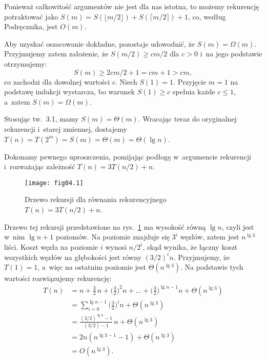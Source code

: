 Ponieważ całkowitość argumentów nie jest dla nas istotna, to możemy rekurencję potraktować jako $S(m)=S(\lfloor m/2\rfloor)+S(\lceil m/2\rceil)+1$, co, według Podręcznika, jest $O(m)$.

Aby uzyskać oszacowanie dokładne, pozostaje udowodnić, że $S(m)=\Omega(m)$. Przyjmujemy zatem założenie, że $S(m/2)\ge cm/2$ dla $c>0$ i~na jego podstawie otrzymujemy:
\[
	S(m) \ge 2cm/2+1 = cm+1 > cm,
\]
co zachodzi dla dowolnej wartości $c$. Niech $S(1)=1$. Przyjęcie $m=1$ na podstawę indukcji wystarcza, bo warunek $S(1)\ge c$ spełnia każde $c\le1$, a~zatem $S(m)=\Omega(m)$.

Stosując tw.~3.1, mamy $S(m)=\Theta(m)$. Wracając teraz do oryginalnej rekurencji i~starej zmiennej, dostajemy $T(n)=T(2^m)=S(m)=\Theta(m)=\Theta(\lg n)$.


\exercise %
Dokonamy pewnego uproszczenia, pomijając podłogę w~argumencie rekurencji i~rozważając zależność $T(n)=3T(n/2)+n$.
\begin{figure}[ht]
	\begin{center}
		\texttt{[image: fig04.1]}
	\end{center}
	\caption{Drzewo rekursji dla równania rekurencyjnego $T(n)=3T(n/2)+n$.} \label{fig:4.2-1}
\end{figure}
Drzewo tej rekursji przedstawione na rys.~\ref{fig:4.2-1} ma wysokość równą $\lg n$, czyli jest w~nim $\lg n+1$ poziomów. Na  poziomie znajduje się $3^i$ węzłów, zatem jest $n^{\lg3}$ liści. Koszt węzła na poziomie $i$ wynosi $n/2^i$, skąd wynika, że łączny koszt wszystkich węzłów na  głębokości jest równy $(3/2)^in$. Przyjmujemy, że $T(1)=1$, a~więc na ostatnim poziomie jest $\Theta(n^{\lg3})$. Na podstawie tych wartości rozwiązujemy rekurencję:
\begin{align*}
	T(n) &= n+\frac{3}{2}\,n+\biggl(\frac{3}{2}\biggr)^2n+\dots+\biggl(\frac{3}{2}\biggr)^{\lg n-1}n+\Theta(n^{\lg3}) \\
	&= \sum_{i=0}^{\lg n-1}\biggl(\frac{3}{2}\biggr)^in+\Theta(n^{\lg3}) \\
	&= \frac{(3/2)^{\lg n}-1}{(3/2)-1}\,n+\Theta(n^{\lg3}) \\[1mm]
	&= 2n(n^{\lg3-1}-1)+\Theta(n^{\lg3}) \\
	&= O(n^{\lg3}).
\end{align*}


